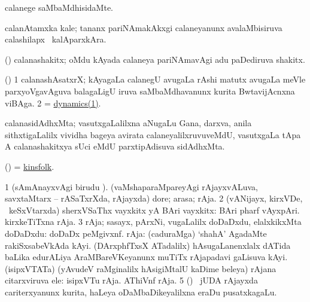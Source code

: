 \bentry
{}
\gl{\kirxvi}
\bmng
calanege saMbaMdhisidaMte. 
\emng
\eentry

\bentry
{}
\gl{\nA}
\bmng
calanAtamxka kale; tananx pariNAmakAkxgi calaneyanunx avalaMbisiruva calashilapx \mo\ kalAparxkAra. 
\emng
\eentry

\bentry
{}
\gl{\nA}
\bmng
(\Bwvi) calanashakitx; oMdu kAyada calaneya pariNAmavAgi adu paDediruva shakitx. 
\emng
\eentry

\bentry
{}
\gl{\nA}
\bmng
(\bava) 
\bnum
\num{1} calanashAsatxrX; kAyagaLa calanegU avugaLa rAshi matutx avugaLa meVle parxyoVgavAguva balagaLigU iruva saMbaMdhavanunx kurita BwtavijAcnxna viBAga. 
\num{2} = \hyperref{kandict_d.pdf}{D}{dynamics(1)}{dynamics(1)}. 
\enum
\emng
\eentry

\bentry
{}
\gl{\nA}
\bmng
calanasidAdhxMta; vasutxgaLalilxna aNugaLu Gana, darxva, anila sithxtigaLalilx vividha bageya avirata calaneyalilxruvuveMdU, vasutxgaLa tApa A calanashakitxya sUci eMdU parxtipAdisuva sidAdhxMta. 
\emng
\eentry

\bentry
{}
\gl{\nA}
\bmng
(\ame)  = \hyperlink{kinsfolk}{kinsfolk}. 
\emng
\eentry

\bentry
{}
\gl{\nA}
\bmng
\bnum
\num{1} (sAmAnayxvAgi birudu ). (vaMshaparaMpareyAgi rAjayxvALuva, savxtaMtarx -- rASaTxrXda, rAjayxda) dore; arasa; rAja. 
\num{2} (vANijayx, kirxVDe, \mo\ keSxVtarxda) sherxVSaThx vayxkitx yA BAri vayxkitx:  BAri pharf vAyxpAri.  kirxkeTiTxna rAja. 
\num{3} rAja; sasayx, pArxNi, \mo vugaLalilx doDaDxdu, elalxkikxMta doDaDxdu:  doDaDx peMgivxnf. 
 rAja: 
\banum
{} (caduraMga) `shahA' AgadaMte rakiSxsabeVkAda kAyi. 
 (DArxphfTxsX ATadalilx) hAsugaLanenxlalx dATida baLika edurALiya AraMBareVKeyanunx muTiTx rAjapadavi gaLisuva kAyi. 
 (isipxVTATa) (yAvudeV raMginalilx hAsigiMtalU kaDime beleya) rAjana citarxviruva ele:  isipxVTu rAja.  AThiVnf rAja. 
\hypertarget{king(1)5}{} 
\eanum
\numie
\num{5} () \kanmu\ jUDA rAjayxda cariterxyanunx kurita, haLeya oDaMbaDikeyalilxna eraDu pusatxkagaLu. 
\enum
\emng

